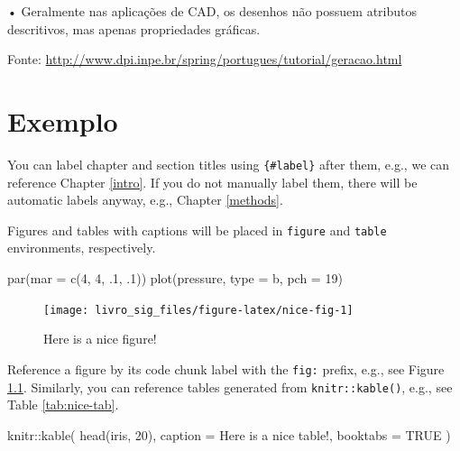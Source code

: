 \documentclass[
]{book}
\newenvironment{Shaded}{\begin{snugshade}}{\end{snugshade}}
\newcommand{\AttributeTok}[1]{\textcolor[rgb]{0.77,0.63,0.00}{#1}}
\newcommand{\ConstantTok}[1]{\textcolor[rgb]{0.00,0.00,0.00}{#1}}
\newcommand{\DecValTok}[1]{\textcolor[rgb]{0.00,0.00,0.81}{#1}}
\newcommand{\FunctionTok}[1]{\textcolor[rgb]{0.00,0.00,0.00}{#1}}
\newcommand{\NormalTok}[1]{#1}
\newcommand{\SpecialCharTok}[1]{\textcolor[rgb]{0.00,0.00,0.00}{#1}}
\newcommand{\StringTok}[1]{\textcolor[rgb]{0.31,0.60,0.02}{#1}}
\begin{document}
• Geralmente nas aplicações de CAD, os desenhos não possuem atributos descritivos, mas apenas propriedades gráficas.

Fonte: \url{http://www.dpi.inpe.br/spring/portugues/tutorial/geracao.html}

\hypertarget{exemplo-1}{%
\chapter{Exemplo}\label{exemplo-1}}

You can label chapter and section titles using \texttt{\{\#label\}} after them, e.g., we can reference Chapter \ref{intro}. If you do not manually label them, there will be automatic labels anyway, e.g., Chapter \ref{methods}.

Figures and tables with captions will be placed in \texttt{figure} and \texttt{table} environments, respectively.

\begin{Shaded}
\begin{Highlighting}[]
\FunctionTok{par}\NormalTok{(}\AttributeTok{mar =} \FunctionTok{c}\NormalTok{(}\DecValTok{4}\NormalTok{, }\DecValTok{4}\NormalTok{, .}\DecValTok{1}\NormalTok{, .}\DecValTok{1}\NormalTok{))}
\FunctionTok{plot}\NormalTok{(pressure, }\AttributeTok{type =} \StringTok{\textquotesingle{}b\textquotesingle{}}\NormalTok{, }\AttributeTok{pch =} \DecValTok{19}\NormalTok{)}
\end{Highlighting}
\end{Shaded}

\begin{figure}

{\centering \texttt{[image: livro\_sig\_files/figure-latex/nice-fig-1]} 

}

\caption{Here is a nice figure!}\label{fig:nice-fig}
\end{figure}

Reference a figure by its code chunk label with the \texttt{fig:} prefix, e.g., see Figure \ref{fig:nice-fig}. Similarly, you can reference tables generated from \texttt{knitr::kable()}, e.g., see Table \ref{tab:nice-tab}.

\begin{Shaded}
\begin{Highlighting}[]
\NormalTok{knitr}\SpecialCharTok{::}\FunctionTok{kable}\NormalTok{(}
  \FunctionTok{head}\NormalTok{(iris, }\DecValTok{20}\NormalTok{), }\AttributeTok{caption =} \StringTok{\textquotesingle{}Here is a nice table!\textquotesingle{}}\NormalTok{,}
  \AttributeTok{booktabs =} \ConstantTok{TRUE}
\NormalTok{)}
\end{Highlighting}
\end{Shaded}
\end{document}
